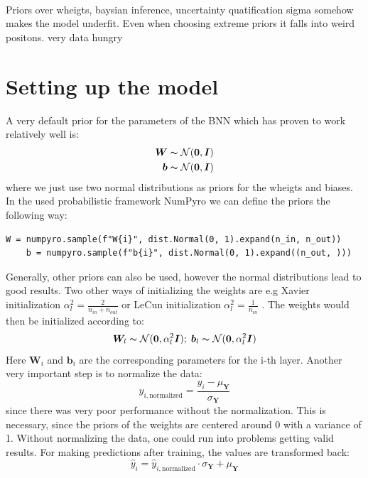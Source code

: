 \documentclass{article}
\newcommand{\Norm}{\mathcal{N}}
\begin{document}
\\
    
Priors over wheigts, baysian inference, uncertainty quatification sigma somehow makes the model underfit. Even when choosing extreme priors it falls into weird positons. very data hungry



\section{Setting up the model}
A very default prior for the parameters of the BNN which has proven to work relatively well \cite{BNNTut} is:
\begin{align}
    \bm W \thicksim \mathcal{N}(\bm 0,\bm I)\\
    \bm b \thicksim \mathcal{N}(\bm 0, \bm I)
\end{align}
where we just use two normal distributions as priors for the wheigts and biases. In the used probabilistic framework NumPyro we can define the priors the following way:
\begin{lstlisting}[caption= {Setting up priors for wheits},captionpos=t]
    W = numpyro.sample(f"W{i}", dist.Normal(0, 1).expand(n_in, n_out))
    b = numpyro.sample(f"b{i}", dist.Normal(0, 1).expand((n_out, )))
\end{lstlisting}
Generally, other priors can also be used, however the normal distributions lead to good results. Two  other ways of initializing the weights are e.g Xavier initialization $\alpha_l^2 = \tfrac{2}{n_{in}+n_{out}}$ or LeCun initialization $\alpha_l^2 = \tfrac{1}{n_{in}}$ \cite{murphy}. The weights would then be initialized according to:
\begin{equation}
    \bm W_l \thicksim \Norm(\bm 0, \alpha_l^2 \bm I); \; \bm b_l \thicksim \Norm(\bm 0, \alpha_l^2 \bm I)
\end{equation}
Here $\bm W_i$ and $\bm b_i$ are the corresponding parameters for the i-th layer. Another very important step is to normalize the data:
\begin{equation}
     y_{i, \text{normalized}} = \frac{ y_i - \mu_{\bm Y}}{\sigma_{\bm Y}}
\end{equation}
since there was very poor performance without the normalization. This is necessary, since the priors of the weights are centered around 0 with a variance of 1. Without normalizing the data, one could run into problems getting valid results. For making predictions after training, the values are transformed back:
\begin{equation}
    \hat{y}_i = \hat{y}_{i,\text{normalized}} \cdot {\sigma_{\bm Y}} + \mu_{\bm Y}
\end{equation}
\end{document}
